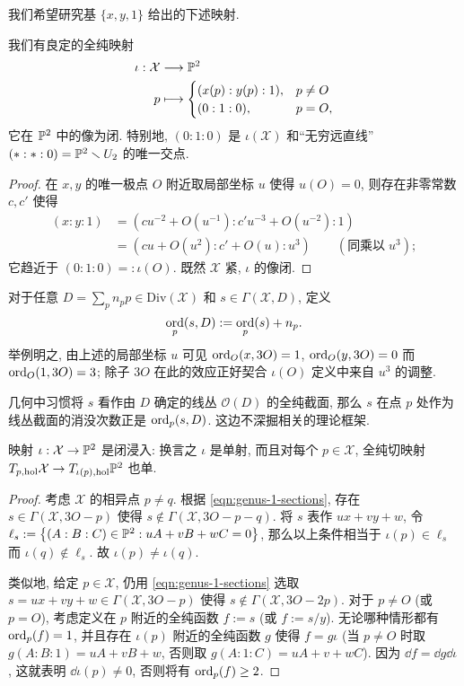 我们希望研究基 $\{x,y,1\}$ 给出的下述映射.
\begin{definition-proposition}
	我们有良定的全纯映射
	\begin{align*}
		\iota: \mathcal{X} & \longrightarrow \mathbb{P}^2 \\
		p & \longmapsto \begin{cases}
			(x(p) : y(p) : 1), & p \neq O \\
			(0 : 1 : 0), & p = O,
		\end{cases}
	\end{align*}
	它在 $\mathbb{P}^2$ 中的像为闭. 特别地, $(0:1:0)$ 是 $\iota(\mathcal{X})$ 和``无穷远直线'' $(*:*:0) = \mathbb{P}^2 \smallsetminus U_2$ 的唯一交点.
\end{definition-proposition}
\begin{proof}
	在 $x,y$ 的唯一极点 $O$ 附近取局部坐标 $u$ 使得 $u(O)=0$, 则存在非零常数 $c, c'$ 使得
	\begin{align*}
		(x : y : 1) & = \left( c u^{-2} + O(u^{-1}) : c' u^{-3} + O(u^{-2}): 1 \right) \\
		& = \left( cu + O(u^2) : c' + O(u) : u^3 \right) \qquad \left(\text{同乘以}\; u^3 \right);
	\end{align*}
	它趋近于 $(0:1:0) =: \iota(O)$. 既然 $\mathcal{X}$ 紧, $\iota$ 的像闭.
\end{proof}

对于任意 $D = \sum_p n_p p \in \text{Div}(\mathcal{X})$ 和 $s \in \Gamma(\mathcal{X}, D)$, 定义
\[ \operatorname*{ord}_p(s,D) := \operatorname*{ord}_p(s) + n_p. \]
举例明之, 由上述的局部坐标 $u$ 可见 $\operatorname*{ord}_O(x, 3O) = 1$, $\operatorname*{ord}_O(y, 3O) = 0$ 而 $\operatorname*{ord}_O(1, 3O) = 3$; 除子 $3O$ 在此的效应正好契合 $\iota(O)$ 定义中来自 $u^3$ 的调整.

几何中习惯将 $s$ 看作由 $D$ 确定的线丛 $\mathcal{O}(D)$ 的全纯截面, 那么 $s$ 在点 $p$ 处作为线丛截面的消没次数正是 $\operatorname*{ord}_p(s, D)$. 这边不深掘相关的理论框架.

\begin{lemma}
	映射 $\iota: \mathcal{X} \to \mathbb{P}^2$ 是闭浸入: 换言之 $\iota$ 是单射, 而且对每个 $p \in \mathcal{X}$, 全纯切映射 $T_{p, \mathrm{hol}} \mathcal{X} \to T_{\iota(p), \mathrm{hol}} \mathbb{P}^2$ 也单.
\end{lemma}
\begin{proof}
	考虑 $\mathcal{X}$ 的相异点 $p \neq q$. 根据 \eqref{eqn:genus-1-sections}, 存在 $s \in \Gamma(\mathcal{X}, 3O - p)$ 使得 $s \notin \Gamma(\mathcal{X}, 3O - p - q)$. 将 $s$ 表作 $ux + vy + w$, 令 $\ell_s := \left\{(A:B:C) \in \mathbb{P}^2 : uA + vB + wC = 0 \right\}$, 那么以上条件相当于 $\iota(p) \in \ell_s$ 而 $\iota(q) \notin \ell_s$. 故 $\iota(p) \neq \iota(q)$.
	
	类似地, 给定 $p \in \mathcal{X}$, 仍用 \eqref{eqn:genus-1-sections} 选取 $s = ux + vy + w \in \Gamma(\mathcal{X}, 3O-p)$ 使得 $s \notin \Gamma(\mathcal{X}, 3O-2p)$. 对于 $p \neq O$ (或 $p = O$), 考虑定义在 $p$ 附近的全纯函数 $f := s$ (或 $f := s/y$). 无论哪种情形都有 $\operatorname*{ord}_p(f) = 1$, 并且存在 $\iota(p)$ 附近的全纯函数 $g$ 使得 $f = g\iota$ (当 $p \neq O$ 时取 $g(A:B:1) = uA+vB+w$, 否则取 $g(A:1:C) = uA + v +wC$). 因为 $\dd f = \dd g \dd \iota$, 这就表明 $\dd\iota(p) \neq 0$, 否则将有 $\operatorname*{ord}_p(f) \geq 2$.
\end{proof}

